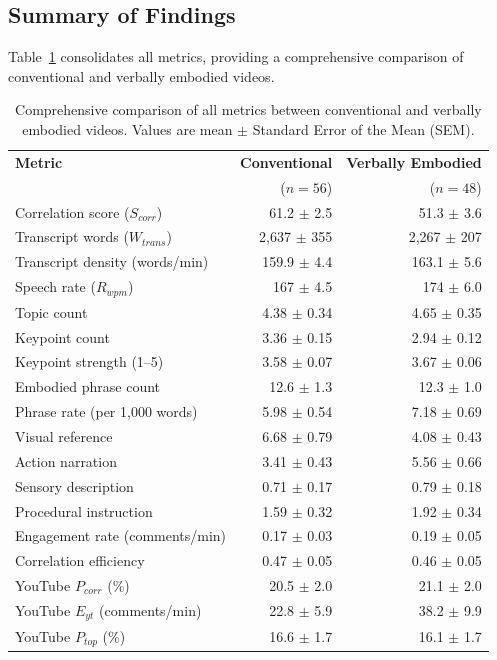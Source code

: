 \documentclass[fleqn,10pt]{JLA_article} %
\begin{document}
\subsection{Summary of Findings}

Table~\ref{tab:full_comparison} consolidates all metrics, providing a comprehensive comparison of conventional and verbally embodied videos.

\begin{table}[h!]
    \centering
    \caption{Comprehensive comparison of all metrics between conventional and verbally embodied videos. Values are mean $\pm$ Standard Error of the Mean (SEM).}
    \begin{tabular}{l r r}
        \toprule
        \textbf{Metric} & \textbf{Conventional} & \textbf{Verbally Embodied} \\
        & ($n = 56$) & ($n = 48$) \\
        \midrule
        Correlation score ($S_{corr}$) & 61.2 $\pm$ 2.5 & 51.3 $\pm$ 3.6 \\
        Transcript words ($W_{trans}$) & 2{,}637 $\pm$ 355 & 2{,}267 $\pm$ 207 \\
        Transcript density (words/min) & 159.9 $\pm$ 4.4 & 163.1 $\pm$ 5.6 \\
        Speech rate ($R_{wpm}$) & 167 $\pm$ 4.5 & 174 $\pm$ 6.0 \\
        Topic count & 4.38 $\pm$ 0.34 & 4.65 $\pm$ 0.35 \\
        Keypoint count & 3.36 $\pm$ 0.15 & 2.94 $\pm$ 0.12 \\
        Keypoint strength (1--5) & 3.58 $\pm$ 0.07 & 3.67 $\pm$ 0.06 \\
        Embodied phrase count & 12.6 $\pm$ 1.3 & 12.3 $\pm$ 1.0 \\
        Phrase rate (per 1{,}000 words) & 5.98 $\pm$ 0.54 & 7.18 $\pm$ 0.69 \\
        Visual reference & 6.68 $\pm$ 0.79 & 4.08 $\pm$ 0.43 \\
        Action narration & 3.41 $\pm$ 0.43 & 5.56 $\pm$ 0.66 \\
        Sensory description & 0.71 $\pm$ 0.17 & 0.79 $\pm$ 0.18 \\
        Procedural instruction & 1.59 $\pm$ 0.32 & 1.92 $\pm$ 0.34 \\
        Engagement rate (comments/min) & 0.17 $\pm$ 0.03 & 0.19 $\pm$ 0.05 \\
        Correlation efficiency & 0.47 $\pm$ 0.05 & 0.46 $\pm$ 0.05 \\
        YouTube $P_{corr}$ (\%) & 20.5 $\pm$ 2.0 & 21.1 $\pm$ 2.0 \\
        YouTube $E_{yt}$ (comments/min) & 22.8 $\pm$ 5.9 & 38.2 $\pm$ 9.9 \\
        YouTube $P_{top}$ (\%) & 16.6 $\pm$ 1.7 & 16.1 $\pm$ 1.7 \\
        \bottomrule
    \end{tabular}
    \label{tab:full_comparison}
\end{table}
\end{document}
